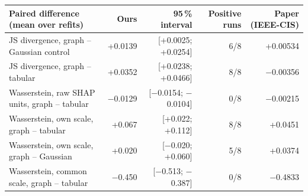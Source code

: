 \begin{tabular}{lrrrr}
\toprule
Paired difference (mean over refits) & Ours & 95\,\% interval & Positive runs & Paper (IEEE-CIS) \\
\midrule
JS divergence, graph -- Gaussian control & +0.0139 & [+0.0025; +0.0254] & 6/8 & +0.00534 \\
JS divergence, graph -- tabular & +0.0352 & [+0.0238; +0.0466] & 8/8 & $-$0.00356 \\
Wasserstein, raw SHAP units, graph -- tabular & $-$0.0129 & [$-$0.0154; $-$0.0104] & 0/8 & $-$0.00215 \\
Wasserstein, own scale, graph -- tabular & +0.067 & [+0.022; +0.112] & 8/8 & +0.0451 \\
Wasserstein, own scale, graph -- Gaussian & +0.020 & [$-$0.020; +0.060] & 5/8 & +0.0374 \\
Wasserstein, common scale, graph -- tabular & $-$0.450 & [$-$0.513; $-$0.387] & 0/8 & $-$0.4833 \\
\bottomrule
\end{tabular}
